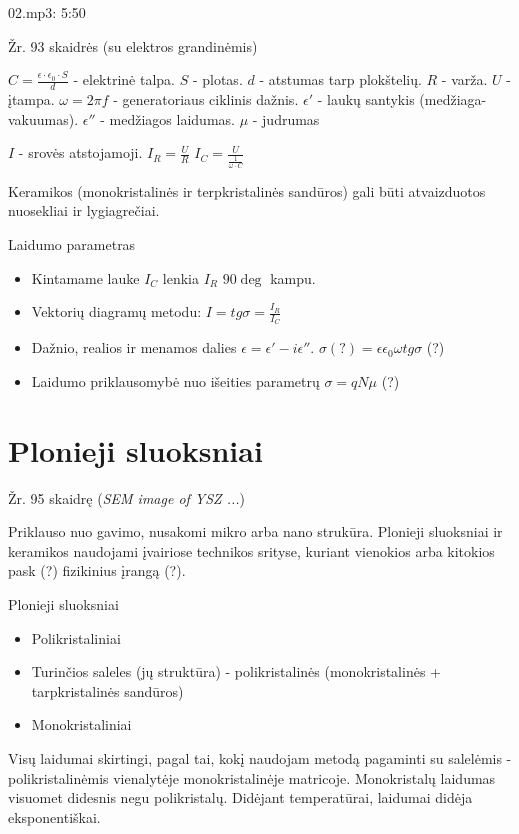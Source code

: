02.mp3: 5:50


Žr. 93 skaidrės (su elektros grandinėmis)

$C = \frac{\epsilon \cdot \epsilon_0 \cdot S}{d}$ - elektrinė talpa.
$S$ - plotas.
$d$ - atstumas tarp plokštelių.
$R$ - varža.
$U$ - įtampa.
$\omega = 2 \pi f$ - generatoriaus ciklinis dažnis.
$\epsilon'$ - laukų santykis (medžiaga-vakuumas).
$\epsilon''$ - medžiagos laidumas.
$\mu$ - judrumas

$I$ - srovės atstojamoji.
$I_R = \frac{U}{R}$
$I_C = \frac{U}{\frac{1}{\omega \cdot C}}$

\begin{remember}
  \item Keramikos (monokristalinės ir terpkristalinės sandūros) gali
  būti atvaizduotos nuosekliai ir lygiagrečiai.
  \item Laidumo parametras\begin{itemize}
    \item Kintamame lauke $I_C$ lenkia $I_R$ $90\deg$ kampu.
    \item Vektorių diagramų metodu: $I = tg \sigma = \frac{I_R}{I_C}$
    \item Dažnio, realios ir menamos dalies
    $\epsilon = \epsilon' - i\epsilon''$.
    $\sigma (?) = \epsilon \epsilon_0 \omega tg \sigma$ (?)
    \item Laidumo priklausomybė nuo išeities parametrų
    $\sigma = qN\mu$ (?)
  \end{itemize}
\end{remember}


\section{Plonieji sluoksniai}
Žr. 95 skaidrę (\textit{SEM image of YSZ ...})

Priklauso nuo gavimo, nusakomi mikro arba nano strukūra.
Plonieji sluoksniai ir keramikos naudojami įvairiose technikos srityse,
kuriant vienokios arba kitokios pask (?) fizikinius įrangą (?).

Plonieji sluoksniai\begin{itemize}
  \item Polikristaliniai
  \item Turinčios saleles (jų struktūra) - polikristalinės
  (monokristalinės + tarpkristalinės sandūros)
  \item Monokristaliniai
\end{itemize}

Visų laidumai skirtingi, pagal tai,
kokį naudojam metodą pagaminti su salelėmis - polikristalinėmis vienalytėje monokristalinėje matricoje.
Monokristalų laidumas visuomet didesnis negu polikristalų.
Didėjant temperatūrai, laidumai didėja eksponentiškai.

